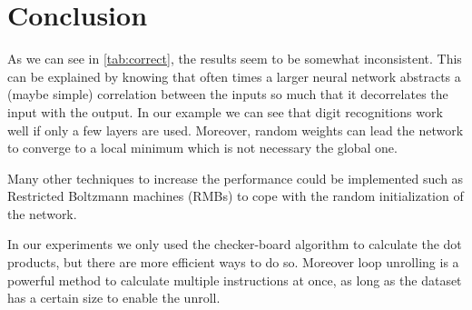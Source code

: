 \documentclass{acm_proc_article-sp}
\begin{document}
\section{Conclusion}

As we can see in \ref{tab:correct}, the results seem to be somewhat inconsistent. This can be explained by knowing that often times a larger neural network abstracts a (maybe simple) correlation between the inputs so much that it decorrelates the input with the output. In our example we can see that digit recognitions work well if only a few layers are used.
Moreover, random weights can lead the network to converge to a local minimum which is not necessary the global one.

Many other techniques to increase the performance could be implemented such as Restricted Boltzmann machines (RMBs) to cope with the random initialization of the network.

In our experiments we only used the checker-board algorithm to calculate the dot products, but there are more efficient ways to do so. Moreover loop unrolling is a powerful method to calculate multiple instructions at once, as long as the dataset has a certain size to enable the unroll.


\newpage



\balancecolumns
\end{document}
